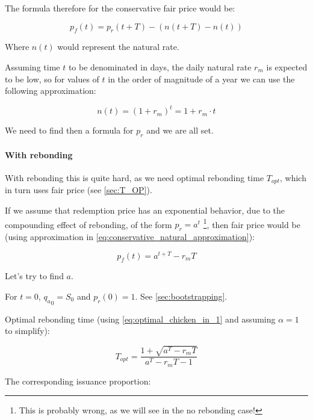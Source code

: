 \documentclass{article}
\begin{document}
The formula therefore for the conservative fair price would be:

\begin{equation}
  \label{eq:conservative-1}
p_f(t) = p_r(t + T) - (n(t+T) - n(t))
\end{equation}

Where $n(t)$ would represent the natural rate.

Assuming time $t$ to be denominated in days, the daily natural rate $r_m$ is expected to be low, so for values of $t$ in the order of magnitude of a year we can use the following approximation:

\begin{equation}
  \label{eq:conservative_natural_approximation}
n(t) = (1 + r_m)^t = 1 + r_m \cdot t
\end{equation}

We need to find then a formula for $p_r$ and we are all set.

\paragraph{With rebonding}
With rebonding this is quite hard, as we need optimal rebonding time $T_{opt}$, which in turn uses fair price (see \ref{sec:T_OP}).

If we assume that redemption price has an exponential behavior, due to the compounding effect of rebonding, of the form $p_r = a^t$ \footnote{This is probably wrong, as we will see in the no rebonding case!}, then fair price would be (using approximation in \ref{eq:conservative_natural_approximation}):

\begin{equation}
  \label{eq:conservative-2}
p_f(t) = a^{t+T} - r_m T
\end{equation}

Let’s try to find $a$.

For $t=0$, ${q_a}_0 = S_0$ and $p_r(0) = 1$. See \ref{sec:bootstrapping}.

Optimal rebonding time (using \ref{eq:optimal_chicken_in_1} and assuming $\alpha = 1$ to simplify):

\begin{equation}
  \label{eq:conservative_T_OP}
T_{opt} = \frac{1+ \sqrt{a^T - r_mT}}{a^T - r_mT - 1}
\end{equation}

The corresponding issuance proportion:
\end{document}
